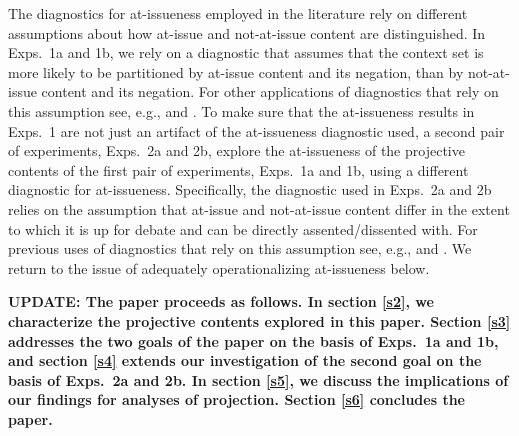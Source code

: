 \documentclass[11pt,fleqn]{article}
\newcommand{\6}{\mbox{$[\hspace*{-.6mm}[$}}
\newcommand{\9}{\mbox{$]\hspace*{-.6mm}]$}}
\begin{document}
The diagnostics for at-issueness employed in the literature rely on different assumptions about how at-issue and not-at-issue content are distinguished. In Exps.~1a and 1b, we rely on a diagnostic that assumes that the context set is more likely to be partitioned by at-issue content and its negation, than by not-at-issue content and its negation. For other applications of diagnostics that rely on this assumption see, e.g., \citealt{amaral-etal07} and \citealt{tonhauser-sula6}. To make sure that the at-issueness results in Exps.~1 are not just an artifact of the at-issueness diagnostic used, a second pair of experiments, Exps.~2a and 2b, explore the at-issueness of the projective contents of the first pair of experiments, Exps.~1a and 1b, using a different diagnostic for at-issueness. Specifically, the diagnostic used in Exps.~2a and 2b relies on the assumption that at-issue and not-at-issue content differ in the extent to which it is up for debate and can be directly assented/dissented with. For previous uses of diagnostics that rely on this assumption see, e.g., \citealt{amaral-etal07,xue-onea11,murray2014,anderbois-etal2015,destruel-etal2015,tonhauser-sula6} and \citealt{syrett-koev2015}. We return to the issue of adequately operationalizing at-issueness below. 

{\bf UPDATE: The paper proceeds as follows. In section \ref{s2}, we characterize the projective contents explored in this paper. Section \ref{s3} addresses the two goals of the paper on the basis of Exps.~1a and 1b, and section \ref{s4} extends our investigation of the second goal on the basis of Exps.~2a and 2b. In section \ref{s5}, we discuss the implications of our findings for analyses of projection. Section \ref{s6} concludes the paper.}



\end{document}
